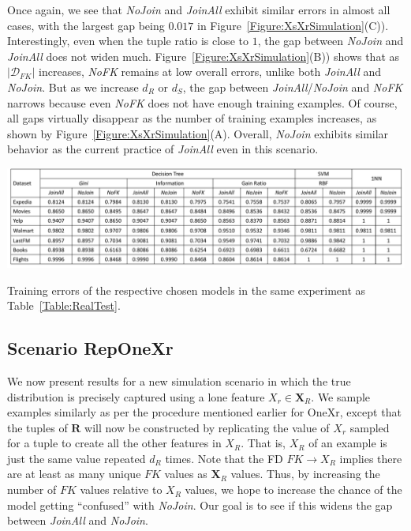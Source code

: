 \documentclass{vldb}
\begin{document}
Once again, we see that \textit{NoJoin} and \textit{JoinAll} exhibit similar errors in almost all cases, with the largest gap being $0.017$ in Figure~\ref{Figure:XsXrSimulation}(C)).
Interestingly, even when the tuple ratio is close to $1$, the gap between \textit{NoJoin} and \textit{JoinAll} does not widen much. 
Figure~\ref{Figure:XsXrSimulation}(B)) shows that as $|\mathcal{D}_{FK}|$ increases, \textit{NoFK} remains at low overall errors, unlike both \textit{JoinAll} and \textit{NoJoin}.
But as we increase $d_R$ or $d_S$, the gap between \textit{JoinAll}/\textit{NoJoin} and \textit{NoFK} narrows because even \textit{NoFK} does not have enough training examples.
Of course, all gaps virtually disappear as the number of training examples increases, as shown by Figure~\ref{Figure:XsXrSimulation}(A).
Overall, \textit{NoJoin} exhibits similar behavior as the current practice of \textit{JoinAll} even in this scenario.

\begin{table}
\centering
\includegraphics[width=2\columnwidth]{table3.pdf}
\caption{Training errors of the respective chosen models in the same experiment as Table~\ref{Table:RealTest}.}
\label{Table:RealTrain}
\end{table}


\subsection{Scenario RepOneXr}
We now present results for a new simulation scenario in which the true distribution is precisely captured using a lone feature $X_r \in \textbf{X}_R$. We sample examples similarly as per the procedure mentioned earlier for OneXr, except that the tuples of $\textbf{R}$ will now be constructed by replicating the value of $X_r$ sampled for a tuple to create all the other features in $X_R$. That is, $X_R$ of an example is just the same value repeated $d_R$ times. Note that the FD $\textit{FK} \rightarrow X_R $ implies there are at least as many unique $FK$ values as $\textbf{X}_R$ values. Thus, by increasing the number of $FK$ values relative to $X_R$ values, we hope to increase the chance of the model getting ``confused'' with \textit{NoJoin}. Our goal is to see if this widens the gap between \textit{JoinAll} and \textit{NoJoin}.
\end{document}
